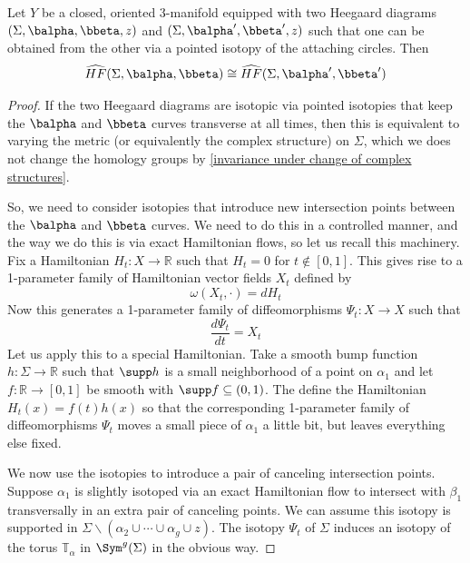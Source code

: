 \begin{thm}
Let $Y$ be a closed, oriented 3-manifold equipped with two Heegaard diagrams $(\Sigma,\balpha,\bbeta,z)$ and $(\Sigma,\balpha',\bbeta',z)$ such that one can be obtained from the other via a pointed isotopy of the attaching circles. Then
\[ \widehat{HF}(\Sigma,\balpha,\bbeta) \cong \widehat{HF}(\Sigma,\balpha',\bbeta') \]
\end{thm}
\begin{proof}
If the two Heegaard diagrams are isotopic via pointed isotopies that keep the $\balpha$ and $\bbeta$ curves transverse at all times, then this is equivalent to varying the metric (or equivalently the complex structure) on $\Sigma$, which we does not change the homology groups by \cref{invariance under change of complex structures}. 

So, we need to consider isotopies that introduce new intersection points between the $\balpha$ and $\bbeta$ curves. We need to do this in a controlled manner, and the way we do this is via exact Hamiltonian flows, so let us recall this machinery. Fix a Hamiltonian $H_t : X \rightarrow \mathbb R$ such that $H_t=0$ for $t \notin [0,1]$. This gives rise to a 1-parameter family of Hamiltonian vector fields $X_t$ defined by
\[ \omega(X_t,\cdot) = dH_t \]
Now this generates a 1-parameter family of diffeomorphisms $\Psi_t : X \rightarrow X$ such that 
\[ \frac{d\Psi_t}{dt} = X_t \]
Let us apply this to a special Hamiltonian. Take a smooth bump function $h : \Sigma \rightarrow \mathbb R$ such that $\supp h$ is a small neighborhood of a point on $\alpha_1$ and let $f : \mathbb R \rightarrow [0,1]$ be smooth with $\supp f \subseteq (0,1)$. The define the Hamiltonian $H_t(x) = f(t) h(x)$ so that the corresponding 1-parameter family of diffeomorphisms $\Psi_t$ moves a small piece of $\alpha_1$ a little bit, but leaves everything else fixed.

We now use the isotopies to introduce a pair of canceling intersection points. Suppose $\alpha_1$ is slightly isotoped via an exact Hamiltonian flow to intersect with $\beta_1$ transversally in an extra pair of canceling points. We can assume this isotopy is supported in $\Sigma \backslash (\alpha_2 \cup \cdots \cup \alpha_g \cup z)$. The isotopy $\Psi_t$ of $\Sigma$ induces an isotopy of the torus $\mathbb T_\alpha$ in $\Sym^g(\Sigma)$ in the obvious way. 


\end{proof}
